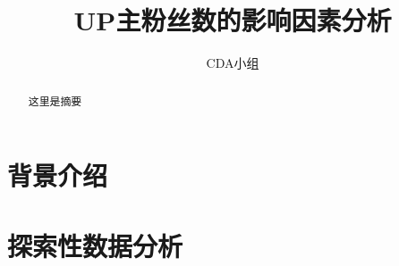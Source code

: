 \documentclass{ctexart}
\title{UP主粉丝数的影响因素分析}
\author{CDA小组}
\date{}
\begin{document}
\maketitle
\begin{abstract}
    这里是摘要
\end{abstract}
\section{背景介绍}
\section{探索性数据分析}
\end{document}
